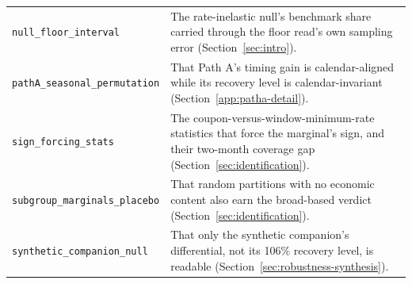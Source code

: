 \documentclass[12pt]{article}
\begin{document}
{\begin{longtable}{@{}p{5.4cm}p{8.8cm}@{}}
\texttt{null\_floor\_interval} & The rate-inelastic null's benchmark share carried through the floor read's own sampling error (Section~\ref{sec:intro}). \\
\texttt{pathA\_seasonal\_permutation} & That Path A's timing gain is calendar-aligned while its recovery level is calendar-invariant (Section~\ref{app:patha-detail}). \\
\texttt{sign\_forcing\_stats} & The coupon-versus-window-minimum-rate statistics that force the marginal's sign, and their two-month coverage gap (Section~\ref{sec:identification}). \\
\texttt{subgroup\_marginals\_placebo} & That random partitions with no economic content also earn the broad-based verdict (Section~\ref{sec:identification}). \\
\texttt{synthetic\_companion\_null} & That only the synthetic companion's differential, not its 106\% recovery level, is readable (Section~\ref{sec:robustness-synthesis}). \\
\bottomrule
\end{longtable}
}
\end{document}
